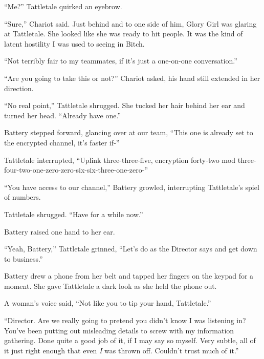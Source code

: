 





``Me?''  Tattletale quirked an eyebrow.



``Sure,'' Chariot said.  Just behind and to one side of him, Glory Girl was glaring at Tattletale.  She looked like she was ready to hit people.  It was the kind of latent hostility I was used to seeing in Bitch.



``Not terribly fair to my teammates, if it's just a one-on-one conversation.''



``Are you going to take this or not?'' Chariot asked, his hand still extended in her direction.



``No real point,'' Tattletale shrugged.  She tucked her hair behind her ear and turned her head.  ``Already have one.''



Battery stepped forward, glancing over at our team, ``This one is already set to the encrypted channel, it's faster if-''



Tattletale interrupted, ``Uplink three-three-five, encryption forty-two mod three-four-two-one-zero-zero-six-six-three-one-zero-''



``You have access to our channel,'' Battery growled, interrupting Tattletale's spiel of numbers.



Tattletale shrugged.  ``Have for a while now.''



Battery raised one hand to her ear.



``Yeah, Battery,'' Tattletale grinned, ``Let's do as the Director says and get down to business.''



Battery drew a phone from her belt and tapped her fingers on the keypad for a moment.  She gave Tattletale a dark look as she held the phone out.



A woman's voice said, ``Not like you to tip your hand, Tattletale.''



``Director.  Are we really going to pretend you didn't know I was listening in?  You've been putting out misleading details to screw with my information gathering.  Done quite a good job of it, if I may say so myself.  Very subtle, all of it just right enough that even \emph{I} was thrown off.  Couldn't trust much of it.''



